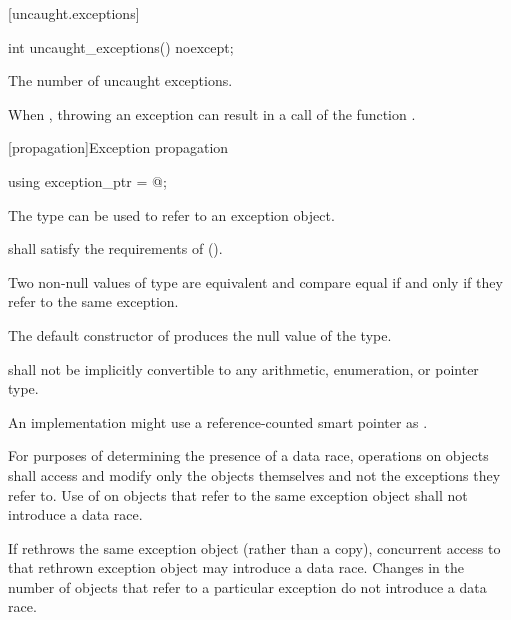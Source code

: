 [uncaught.exceptions]{}

%
\begin{itemdecl}
int uncaught_exceptions() noexcept;
\end{itemdecl}

\begin{itemdescr}
\pnum
\returns
The number of uncaught exceptions.

\pnum
\remarks
When ,
throwing an exception can result in a call of the function
.
\end{itemdescr}

[propagation]{Exception propagation}

%
\begin{itemdecl}
using exception_ptr = @\unspec@;
\end{itemdecl}

\begin{itemdescr}
\pnum
The type  can be used to refer to an exception object.

\pnum
{} shall satisfy the requirements of
 ().

\pnum
Two non-null values of type  are equivalent and compare equal if and
only if they refer to the same exception.

\pnum
The default constructor of  produces the null value of the
type.

\pnum
{} shall not be implicitly convertible to any arithmetic,
enumeration, or pointer type.

\pnum
\begin{note} An implementation might use a reference-counted smart
pointer as . \end{note}

\pnum
For purposes of determining the presence of a data race, operations on
 objects shall access and modify only the
 objects themselves and not the exceptions they refer to.
Use of  on  objects that refer to
the same exception object shall not introduce a data race. \begin{note} If
 rethrows the same exception object (rather than a copy),
concurrent access to that rethrown exception object may introduce a data race.
Changes in the number of  objects that refer to a
particular exception do not introduce a data race. \end{note}
\end{itemdescr}

